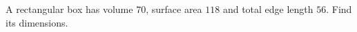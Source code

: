 A rectangular box has volume $70$, surface area $118$ and total edge length $56$. Find its dimensions.
